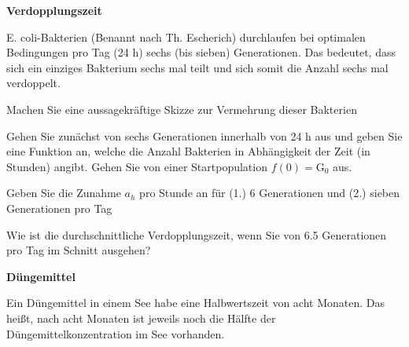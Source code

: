 \bbwActAufgabenNr{} \textbf{Verdopplungszeit}

E. coli-Bakterien (Benannt nach Th. Escherich) durchlaufen bei
optimalen Bedingungen pro Tag (24 h) sechs (bis sieben) Generationen. Das
bedeutet, dass sich ein einziges Bakterium sechs mal teilt und sich
somit die Anzahl sechs mal verdoppelt.

\begin{bbwAufgabenBlock}

\item Machen Sie eine aussagekräftige Skizze zur Vermehrung dieser Bakterien
  
\item Gehen Sie zunächst von sechs Generationen innerhalb von 24 h aus
  und geben Sie eine Funktion an, welche die Anzahl Bakterien in
  Abhängigkeit der Zeit (in Stunden) angibt. Gehen Sie von einer
  Startpopulation $f(0) = \text{G}_0$ aus.

  
  
  
\item Geben Sie die Zunahme $a_h$ pro Stunde an für (1.) 6 Generationen
  und (2.) sieben Generationen pro Tag

 

  
\item Wie ist die durchschnittliche Verdopplungszeit, wenn Sie von 6.5 Generationen pro
  Tag im Schnitt ausgehen?
  

\end{bbwAufgabenBlock}
\newpage


\bbwActAufgabenNr{} \textbf{Düngemittel}

Ein Düngemittel in einem See habe eine Halbwertszeit von acht
Monaten. Das heißt, nach acht Monaten ist jeweils noch die Hälfte der
Düngemittelkonzentration im See vorhanden.

